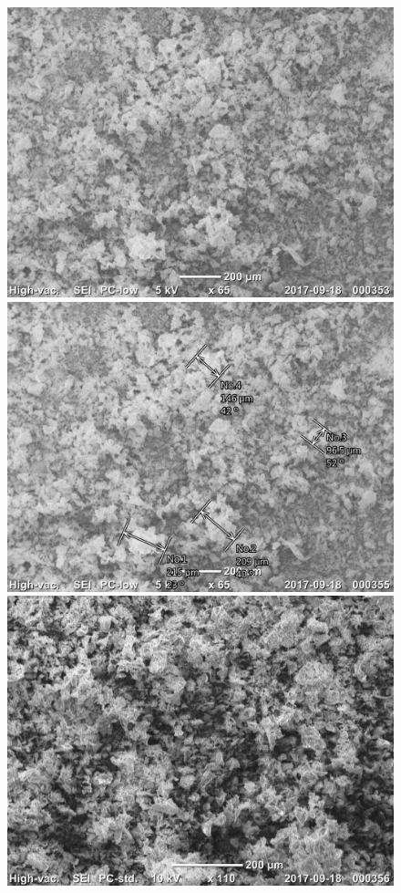 \documentclass[12pt]{article}
\begin{document}
\begin{figure}[!ht]
	\centering
	\includegraphics[scale=0.7]{pictures/20170918_000353.jpg}
	\includegraphics[scale=0.7]{pictures/20170918_000355.jpg}
	\includegraphics[scale=0.7]{pictures/20170918_000356.jpg}

\end{figure}
\end{document}
